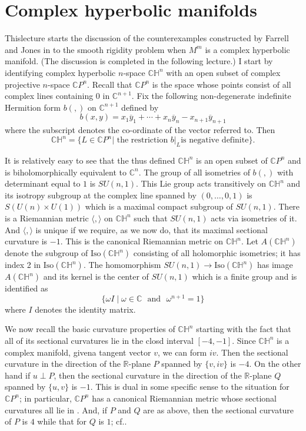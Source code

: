 \chapter{Complex hyperbolic manifolds}\label{c18}

This\pageoriginale lecture starts the discussion of the
counterexamples constructed by Farrell and Jones in \cite{46} to the
smooth rigidity problem when $M^{m}$ is a complex hyperbolic
manifold. (The discussion is completed in the following lecture.) I
start by identifying complex hyperbolic $n$-space $\mathbb{CH}^{n}$
with an open subset of complex projective $n$-space
$\mathbb{C}P^{n}$. Recall that $\mathbb{C}P^{n}$ is the space whose
points consist of all complex lines containing $0$ in
$\mathbb{C}^{n+1}$. Fix the following non-degenerate indefinite
Hermition form $b(,)$ on $\mathbb{C}^{n+1}$ defined by
$$
b(x,y)=x_{1}\overline{y}_{1}+\cdots+x_{n}\overline{y}_{n}-x_{n+1}\overline{y}_{n+1}
$$
where the subscript denotes the co-ordinate of the vector referred
to. Then
$$
\mathbb{CH}^{n}=\{L\in \mathbb{C}P^{n}|\text{~the restriction $b|_{L}$
  is negative definite}\}.
$$

It is relatively easy to see that the thus defined $\mathbb{CH}^{n}$
is an open subset of $\mathbb{C}P^{n}$ and is biholomorphically
equivalent to $\mathbb{C}^{n}$. The group of all isometries of $b(,)$
with determinant equal to $1$ is $SU(n,1)$. This Lie group acts
transitively on $\mathbb{CH}^{n}$ and its isotropy subgroup at the
complex line spanned by $(0,\ldots,0,1)$ is $S(U(n)\times U(1))$ which
is a maximal compact subgroup of $SU(n,1)$. There is a Riemannian
metric $\langle,\rangle$ on $\mathbb{CH}^{n}$ such that $SU(n,1)$ acts
via isometries of it. And $\langle,\rangle$ is unique if we require,
as we now do, that its maximal sectional curvature is $-1$. This is
the canonical Riemannian metric on $\mathbb{CH}^{n}$. Let
$A(\mathbb{CH}^{n})$ denote the subgroup of
$\text{Iso}(\mathbb{CH}^{n})$ consisting of all holomorphic
isometries; it has index 2 in $\text{Iso}(\mathbb{CH}^{n})$. The
homomorphism $SU(n,1)\to \text{Iso}(\mathbb{CH}^{n})$ has image
$A(\mathbb{CH}^{n})$ and its kernel is the center of $SU(n,1)$ which
is a finite group and is identified as 
$$
\{\omega I\mid \omega\in \mathbb{C}\text{~ and~ } \omega^{n+1}=1\}
$$
where $I$ denotes the identity matrix.

We now recall the basic curvature properties of $\mathbb{CH}^{n}$
starting with the fact that all of its sectional curvatures lie in the
closd interval $[-4,-1]$. Since $\mathbb{CH}^{n}$ is a complex
manifold, given\pageoriginale a tangent vector $v$, we can form
$iv$. Then the sectional curvature in the direction of the
$\mathbb{R}$-plane $P$ spanned by $\{v,iv\}$ is $-4$. On the other
hand if $u\perp P$, then the sectional curvature in the direction of
the $\mathbb{R}$-plane $Q$ spanned by $\{u,v\}$ is $-1$. This is dual
in some specific sense to the situation for $\mathbb{C}P^{n}$; in
particular, $\mathbb{C}P^{n}$ has a canonical Riemannian metric whose
sectional curvatures all lie in \cite{1,4}. And, if $P$ and $Q$ are as
above, then the sectional curvature of $P$ is $4$ while that for $Q$
is $1$; cf.\@ \cite[pp. 321-329]{82}.

